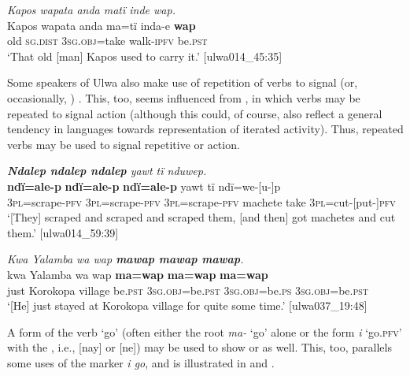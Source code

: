 \ea%
    \label{ex:loss:3}
           \textit{Kapos wapata anda matï inde \textit{wap}.}\\
\gll Kapos  wapata    anda    ma=tï      inda-e    \textbf{wap}\\
    [name]  old      \textsc{sg.dist}  3\textsc{sg.obj}=take  walk-\textsc{ipfv}  be.\textsc{pst}\\
\glt `That old [man] Kapos used to carry it.’ [ulwa014\_45:35]
\z

Some speakers of Ulwa also make use of  repetition of verbs to signal  (or, occasionally, ) . This, too, seems influenced from , in which verbs may be repeated to signal  action (although this could, of course, also reflect a general tendency in languages towards  representation of iterated activity). Thus, repeated verbs may be used to signal repetitive  or   action.

\ea%
    \label{ex:loss:4}
            \textit{\textbf{Ndalep ndalep ndalep} yawt tï nduwep.}\\
\gll    \textbf{ndï=ale-p}      \textbf{ndï=ale-p}      \textbf{ndï=ale-p}      yawt tï    ndï=we-[u-]p\\
    3\textsc{pl}=scrape-\textsc{pfv}  3\textsc{pl}=scrape-\textsc{pfv}  \textsc{3pl}=scrape-\textsc{pfv}  machete    take  3\textsc{pl}=cut-[put-]\textsc{pfv}\\
\glt `[They] scraped and scraped and scraped them, [and then] got machetes and cut them.’ [ulwa014\_59:39]
\z

\ea%
    \label{ex:loss:5}
            \textit{Kwa Yalamba wa wap \textbf{mawap mawap mawap}.}\\
\gll kwa  Yalamba  wa    wap  \textbf{ma=wap}      \textbf{ma=wap}     \textbf{ma=wap}\\
    just    Korokopa  village  be.\textsc{pst}  \textsc{3sg.obj=}be.\textsc{pst}  \textsc{3sg.obj=}be.\textsc{ps}    \textsc{3sg.obj=}be.\textsc{pst}\\
\glt `[He] just stayed at Korokopa village for quite some time.’ [ulwa037\_19:48]
\z

A form of the verb ‘go’ (often either the root \textit{ma-} ‘go’ alone or the   form \textit{i} ‘go.\textsc{pfv’} with the  , i.e., [nay] or [ne]) may be used to show  or   as well. This, too, parallels some uses of the   marker \textit{i go}, and is illustrated in  and .

